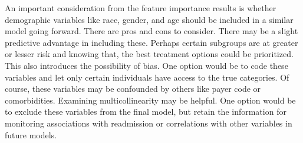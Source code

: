 \documentclass{article}      %
\begin{document}
An important consideration from the feature importance results is whether demographic variables like race, gender, and age should be included in a similar model going forward. There are pros and cons to consider. There may be a slight predictive advantage in including these. Perhaps certain subgroups are at greater or lesser risk and knowing that, the best treatment options could be prioritized. This also introduces the possibility of bias. One option would be to code these variables and let only certain individuals have access to the true categories. Of course, these variables may be confounded by others like payer code or comorbidities. Examining multicollinearity may be helpful. One option would be to exclude these variables from the final model, but retain the information for monitoring associations with readmission or correlations with other variables in future models.
\end{document}
